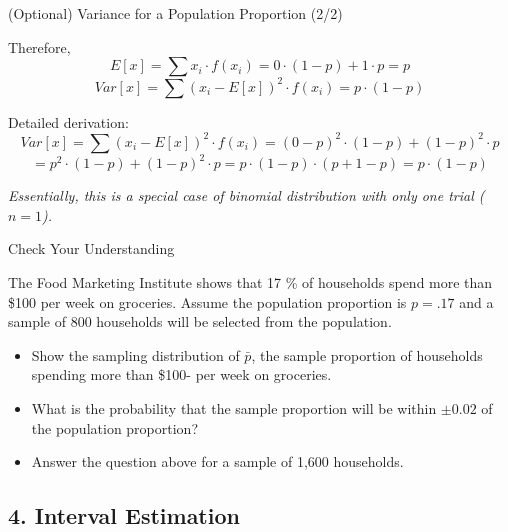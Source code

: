 \documentclass{beamer}
\begin{document}
\begin{frame}{(Optional) Variance for a Population Proportion (2/2) }

Therefore,
$$ E \left[x \right] = \sum x_i \cdot f(x_i) = 0 \cdot (1-p) + 1 \cdot p = p $$
$$ Var \left[x \right] = \sum (x_i - E \left[x \right])^2 \cdot f(x_i) = p \cdot (1-p)$$


Detailed derivation: 
$$ Var \left[x \right] = \sum (x_i - E \left[x \right])^2 \cdot f(x_i) = (0 - p)^2\cdot (1-p) + (1 - p)^2 \cdot p $$
$$ = p^2 \cdot (1-p) + (1-p)^2 \cdot p = p\cdot (1-p) \cdot (p + 1- p) = p \cdot (1-p)$$

\textit{Essentially, this is a special case of binomial distribution with only one trial ($n = 1$).}

\end{frame}



\begin{frame}{Check Your Understanding}

The Food Marketing Institute shows that 17 \% of households spend more than \$100 per week on groceries. Assume the population proportion is $p = .17$ and a sample of 800 households will be selected from the population. 

\begin{itemize}
\item Show the sampling distribution of $\bar{p}$, the sample proportion of households spending more than \$100- per week on groceries. 
\item What is the probability that the sample proportion will be within $\pm 0.02$ of the population proportion?
\item Answer the question above for a sample of 1,600 households. 
\end{itemize}


\end{frame}




\subsection{4. Interval Estimation}
\begin{frame}
\subsectionpage
\end{frame}
\end{document}
